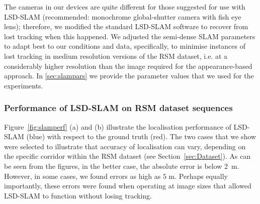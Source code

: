 The cameras in our devices are quite different for those suggested for use with LSD-SLAM (recommended: monochrome global-shutter camera with fish eye lens); therefore, we modified the standard LSD-SLAM software to recover from lost tracking when this happened. We adjusted the semi-dense SLAM parameters to adapt best to our conditions and data, specifically, to minimise instances of lost tracking in medium resolution versions of the RSM dataset, i.e. at a considerably higher resolution than the image required for the appearance-based approach. In \ref{sec:slampars} we provide the parameter values that we used for the experiments.


\subsubsection{Performance of LSD-SLAM on RSM dataset sequences}

Figure~\ref{fig:slamperf} (a) and (b) illustrate the localisation performance of LSD-SLAM (blue) with respect to the ground truth (red). The two cases that we show were selected to illustrate that accuracy of localisation can vary, depending on the specific corridor within the RSM dataset (see Section~\ref{sec:Dataset}). As can be seen from the figures, in the better case, the absolute error is below \SI{2}{\metre}. However, in some cases, we found errors as high as $5$ m. Perhaps equally importantly, these errors were found when operating at image sizes that allowed LSD-SLAM to function without losing tracking.

